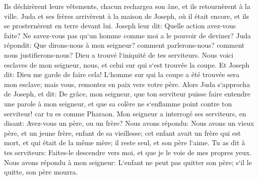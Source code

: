 \verse Ils déchirèrent leurs vêtements, chacun rechargea son âne, et ils retournèrent à la ville. 
\verse Juda et ses frères arrivèrent à la maison de Joseph, où il était encore, et ils se prosternèrent en terre devant lui. 
\verse Joseph leur dit: Quelle action avez-vous faite? Ne savez-vous pas qu`un homme comme moi a le pouvoir de deviner? 
\verse Juda répondit: Que dirons-nous à mon seigneur? comment parlerons-nous? comment nous justifierons-nous? Dieu a trouvé l`iniquité de tes serviteurs. Nous voici esclaves de mon seigneur, nous, et celui sur qui s`est trouvée la coupe. 
\verse Et Joseph dit: Dieu me garde de faire cela! L`homme sur qui la coupe a été trouvée sera mon esclave; mais vous, remontez en paix vers votre père. 
\verse Alors Juda s`approcha de Joseph, et dit: De grâce, mon seigneur, que ton serviteur puisse faire entendre une parole à mon seigneur, et que sa colère ne s`enflamme point contre ton serviteur! car tu es comme Pharaon. 
\verse Mon seigneur a interrogé ses serviteurs, en disant: Avez-vous un père, ou un frère? 
\verse Nous avons répondu: Nous avons un vieux père, et un jeune frère, enfant de sa vieillesse; cet enfant avait un frère qui est mort, et qui était de la même mère; il reste seul, et son père l`aime. 
\verse Tu as dit à tes serviteurs: Faites-le descendre vers moi, et que je le voie de mes propres yeux. 
\verse Nous avons répondu à mon seigneur: L`enfant ne peut pas quitter son père; s`il le quitte, son père mourra. 
